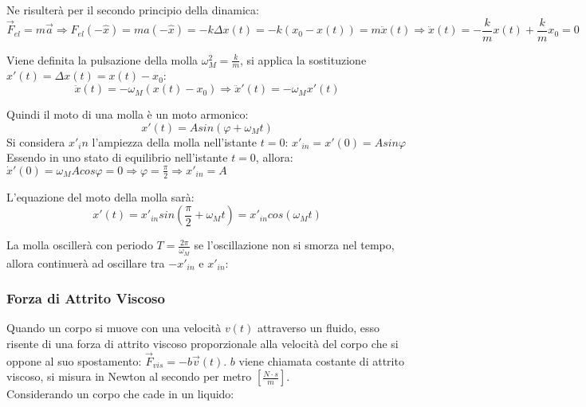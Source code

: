\documentclass{article}
\numberwithin{equation}{subsection}
\begin{document}
Ne risulterà per il secondo principio della dinamica:
\begin{equation}
    \vec{F}_{el}=m\vec{a}\Rightarrow F_{el}(-\hat{x})=ma(-\hat{x})=-k\Delta x(t)=-k(x_0-x(t))=m\ddot x(t)\Rightarrow\ddot x(t)=-\displaystyle\frac{k}{m}x(t)+\frac{k}{m}x_0=0
\end{equation}

Viene definita la pulsazione della molla $\omega_M^{2}=\displaystyle\frac{k}{m}$, 
si applica la sostituzione $x'(t)=\Delta x(t)=x(t)-x_0$:
\begin{equation}
    \ddot x(t)=-\omega_M(x(t)-x_0)\Rightarrow\ddot x'(t)=-\omega_Mx'(t)
\end{equation}

Quindi il moto di una molla è un moto armonico:
\begin{equation}
    x'(t)=Asin(\varphi + \omega_Mt)
\end{equation}
Si considera $x'_in$ l'ampiezza della molla nell'istante $t=0$:
$x'_{in}=x'(0)=Asin\varphi$
Essendo in uno stato di equilibrio nell'istante $t=0$, allora: 
$\dot x'(0)=\omega_MAcos\varphi=0\Rightarrow\varphi=\displaystyle\frac{\pi}{2}\Rightarrow x'_{in}=A$

L'equazione del moto della molla sarà:
\begin{equation}
    x'(t)=x'_{in}sin\left(\displaystyle\frac{\pi}{2}+\omega_Mt\right)=x'_{in}cos(\omega_Mt)
\end{equation}

La molla oscillerà con periodo $T=\displaystyle\frac{2\pi}{\omega_M}$ 
se l'oscillazione non si smorza nel tempo, allora 
continuerà ad oscillare tra $-x'_{in}$ e $x'_{in}$:

\begin{center}\end{center}

\subsubsection{Forza di Attrito Viscoso}
Quando un corpo si muove con una velocità $v(t)$ attraverso 
un fluido, esso risente di una forza di attrito viscoso 
proporzionale alla velocità del corpo che si oppone al 
suo spostamento: $\vec{F}_{vis}=-b\vec{v}(t)$. $b$ viene 
chiamata costante di attrito viscoso, si misura in Newton al 
secondo per metro $\left[\displaystyle\frac{N\cdot s}{m}\right]$.\\
Considerando un corpo che cade in un liquido: 
\end{document}
